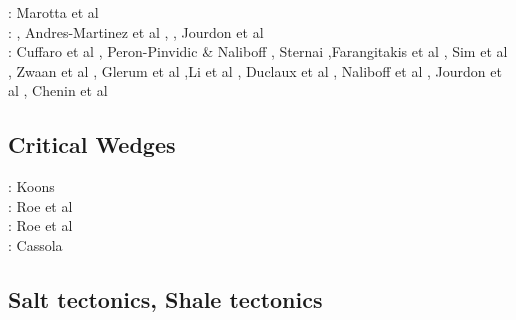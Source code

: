 \begin{scriptsize}
\twothousandeighteen: 
\cite{chsm18}\cite{brwm18}\cite{brun18}\cite{tebu18}\cite{jebu18}\cite{sahf18}\cite{pesn18}
      \cite{mord18}\cite{webe18}\cite{webe18b}\cite{gebu18} Marotta et al \cite{marc18}\\
\twothousandnineteen: \cite{lisp19}\cite{zwsb19}, Andres-Martinez et al \cite{anpa19},
                      \cite{dual19}\cite{mocb19}\cite{chmd19}\cite{thhu19}
      \cite{jala19}\cite{hooi19}\cite{lapk19}, Jourdon et al \cite{jolm19}\\
\twothousandtwenty: Cuffaro et al \cite{cump20}, Peron-Pinvidic \& Naliboff \cite{pena20}, 
                    Sternai \cite{ster20},Farangitakis et al \cite{fahm20}, Sim et al \cite{siss20}, 
                    Zwaan et al \cite{zwsr20}, Glerum et al \cite{glbs20},Li et al \cite{lial20}, 
                    Duclaux et al \cite{duhm20}, Naliboff et al \cite{nagb20}, Jourdon et al \cite{jolm20},
                    Chenin et al \cite{chsm20} 
\end{scriptsize}




\subsection{Critical Wedges}

\begin{scriptsize}
\nineteenninetyfour: Koons \cite{koon94}\\
\twothousandsix: Roe et al \cite{rosw06}\\
\twothousandeight: Roe et al \cite{rowf08}\\
\twothousandthirteen: Cassola \cite{cass13}
\end{scriptsize}


\subsection{Salt tectonics, Shale tectonics}

